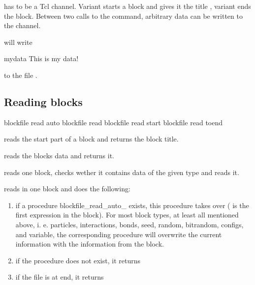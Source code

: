  has to be a Tcl channel.  Variant  starts a
block and gives it the title , variant  ends the
block. Between two calls to the command, arbitrary data can be written
to the channel.


will write 
\begin{tclcode}
{mydata {This is my data!}}
\end{tclcode}
to the file .


\subsection{Reading blocks}

\begin{essyntax}
   blockfile  read auto 
   blockfile  read 
   blockfile  read start 
   blockfile  read toend 
\end{essyntax}

reads the start part of a block and returns the block title.

  reads the blocks data and returns it.

reads one block, checks wether it contains data of the given type and
reads it.

  reads in one block and does the following:
  \begin{enumerate}
  \item if a procedure blockfile\_read\_auto\_ exists, this
    procedure takes over ( is the first expression in the
    block). For most block types, at least all mentioned above, i. e.
    particles, interactions, bonds, seed, random, bitrandom, configs,
    and variable, the corresponding procedure will overwrite the
    current information with the information from the block.
  \item if the procedure does not exist, it returns 
  \item if the file is at end, it returns 
  \end{enumerate}

